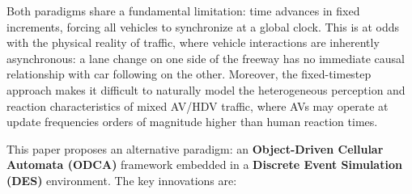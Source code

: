 \documentclass[review,authoryear]{elsarticle}
\begin{document}
Both paradigms share a fundamental limitation: time advances in fixed increments, forcing all vehicles to synchronize at a global clock. This is at odds with the physical reality of traffic, where vehicle interactions are inherently asynchronous: a lane change on one side of the freeway has no immediate causal relationship with car following on the other. Moreover, the fixed-timestep approach makes it difficult to naturally model the heterogeneous perception and reaction characteristics of mixed AV/HDV traffic, where AVs may operate at update frequencies orders of magnitude higher than human reaction times.

This paper proposes an alternative paradigm: an \textbf{Object-Driven Cellular Automata (ODCA)} framework embedded in a \textbf{Discrete Event Simulation (DES)} environment. The key innovations are:
\end{document}
